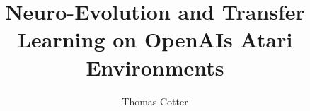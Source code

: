 \documentclass[a4paper,11pt,twoside]{report}
\begin{document}
\title{Neuro-Evolution and Transfer Learning on OpenAIs Atari Environments}

\author{Thomas Cotter}

\normallinespacing
\maketitle

\preface


\body









\end{document}
